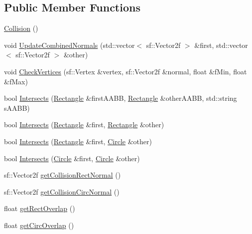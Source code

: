 \subsection*{Public Member Functions}
\begin{DoxyCompactItemize}
\item 
\hyperlink{class_collision_aea8004fbf48b79b5db7b784688b23788}{Collision} ()
\item 
void \hyperlink{class_collision_a447fe84c543fc402f1779d0771773878}{Update\+Combined\+Normals} (std\+::vector$<$ sf\+::\+Vector2f $>$ \&first, std\+::vector$<$ sf\+::\+Vector2f $>$ \&other)
\item 
void \hyperlink{class_collision_acfff38c9712d0671e466daae126eade0}{Check\+Vertices} (sf\+::\+Vertex \&vertex, sf\+::\+Vector2f \&normal, float \&f\+Min, float \&f\+Max)
\item 
bool \hyperlink{class_collision_aa449054d324451f054a312479334f006}{Intersects} (\hyperlink{class_rectangle}{Rectangle} \&first\+A\+A\+BB, \hyperlink{class_rectangle}{Rectangle} \&other\+A\+A\+BB, std\+::string s\+A\+A\+BB)
\item 
bool \hyperlink{class_collision_afe374ad46bd824d5311a805771d74d4c}{Intersects} (\hyperlink{class_rectangle}{Rectangle} \&first, \hyperlink{class_rectangle}{Rectangle} \&other)
\item 
bool \hyperlink{class_collision_a437a8d88145b86b460cd60b432cc3e9e}{Intersects} (\hyperlink{class_rectangle}{Rectangle} \&first, \hyperlink{class_circle}{Circle} \&other)
\item 
bool \hyperlink{class_collision_a6bec285cd3ceab74dbbc8c861454a973}{Intersects} (\hyperlink{class_circle}{Circle} \&first, \hyperlink{class_circle}{Circle} \&other)
\item 
sf\+::\+Vector2f \hyperlink{class_collision_af6b664b6ea60154584aa0715d7d2633a}{get\+Collision\+Rect\+Normal} ()
\item 
sf\+::\+Vector2f \hyperlink{class_collision_a1b186d29f5e80d453219098b317511d3}{get\+Collision\+Circ\+Normal} ()
\item 
float \hyperlink{class_collision_a87622ae46722faf9929bcd1b9d1183bd}{get\+Rect\+Overlap} ()
\item 
float \hyperlink{class_collision_a955a13843b8a621ec84e4201af14d418}{get\+Circ\+Overlap} ()
\end{DoxyCompactItemize}
